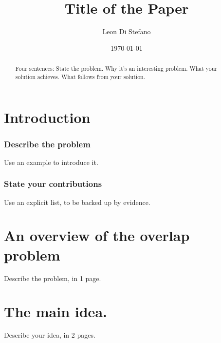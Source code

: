 \documentclass[11pt]{article}
\title{Title of the Paper}
\author{Leon Di Stefano}
\date{\today}
\begin{document}
\maketitle

\begin{abstract}\noindent

    Four sentences: 
    State the problem. 
    Why it's an interesting problem.
    What your solution achieves.
    What follows from your solution.
    
    
    
    
\end{abstract}

\section{Introduction}
\subsubsection*{Describe the problem}

Use an example to introduce it.

\subsubsection*{State your contributions}

Use an explicit list, to be backed up by evidence.

\section{An overview of the overlap problem}

Describe the problem, in 1 page.

\section{The main idea.}


Describe your idea, in 2 pages.
\end{document}

